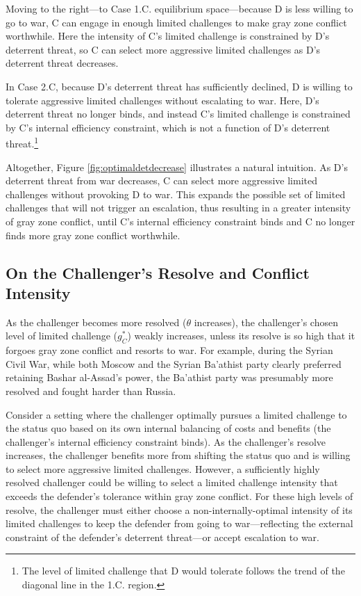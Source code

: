 \documentclass[11pt,letterpaper,pdftex,dvipsnames,table]{article}
\begin{document}
Moving to the right---to Case 1.C. equilibrium space---because D is less willing to go to war, C can engage in enough limited challenges to make gray zone conflict worthwhile. Here the intensity of C's limited challenge is constrained by D's deterrent threat, so C can select more aggressive limited challenges as D's deterrent threat decreases.

In Case 2.C, because D's deterrent threat has sufficiently declined, D is willing to tolerate aggressive limited challenges without escalating to war. Here, D's deterrent threat no longer binds, and instead C's limited challenge is constrained by C's internal efficiency constraint, which is not a function of D's deterrent threat.\footnote{The level of limited challenge that D would tolerate follows the trend of the diagonal line in the 1.C. region.}

Altogether, Figure \ref{fig:optimaldetdecrease} illustrates a natural intuition. As D's deterrent threat from war decreases, C can select more aggressive limited challenges without provoking D to war. This expands the possible set of limited challenges that will not trigger an escalation, thus resulting in a greater intensity of gray zone conflict, until C's internal efficiency constraint binds and C no longer finds more gray zone conflict worthwhile.

\subsection{On the Challenger's Resolve and Conflict Intensity}
As the challenger becomes more resolved ($\theta$ increases), the challenger's chosen level of limited challenge ($g_{C}^{*}$) weakly increases, unless its resolve is so high that it forgoes gray zone conflict and resorts to war. For example, during the Syrian Civil War, while both Moscow and the Syrian Ba'athist party clearly preferred retaining Bashar al-Assad's power, the Ba'athist party was presumably more resolved and fought harder than Russia.

Consider a setting where the challenger optimally pursues a limited challenge to the status quo based on its own internal balancing of costs and benefits (the challenger's internal efficiency constraint binds). As the challenger's resolve increases, the challenger benefits more from shifting the status quo and is willing to select more aggressive limited challenges. However, a sufficiently highly resolved challenger could be willing to select a limited challenge intensity that exceeds the defender's tolerance within gray zone conflict. For these high levels of resolve, the challenger must either choose a non-internally-optimal intensity of its limited challenges to keep the defender from going to war---reflecting the external constraint of the defender's deterrent threat---or accept escalation to war.
\end{document}
